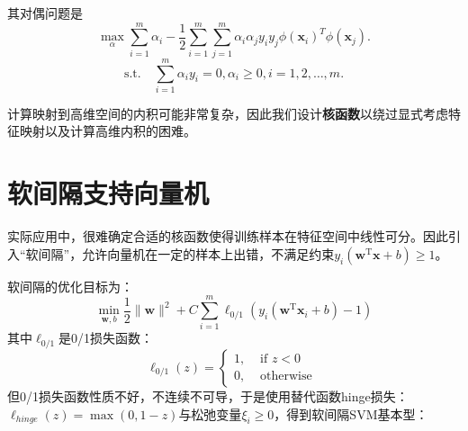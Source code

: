 其对偶问题是
\[
\max_{\alpha} \sum_{i=1}^m \alpha_i - \frac{1}{2} \sum_{i=1}^m \sum_{j=1}^m \alpha_i \alpha_j y_i y_j \phi(\boldsymbol x_i)^T \phi(\boldsymbol x_j).
\]
\[
\text{s.t.} \quad \sum_{i=1}^m\alpha_iy_i = 0, \alpha_i \ge 0, i= 1, 2, \ldots, m.
\]

计算映射到高维空间的内积可能非常复杂，因此我们设计\textbf{核函数}以绕过显式考虑特征映射以及计算高维内积的困难。


\begin{figure}[!htbp]
	\centering
\end{figure}

\section{软间隔支持向量机}\label{sec:4.6}
实际应用中，很难确定合适的核函数使得训练样本在特征空间中线性可分。因此引入“软间隔”，允许向量机在一定的样本上出错，不满足约束$y_i(\boldsymbol{w}^\mathrm{T}\boldsymbol{x}+b) \ge 1$。

软间隔的优化目标为：
\[
\min _{\boldsymbol{w}, b} \frac{1}{2}\|\boldsymbol{w}\|^{2}+C \sum_{i=1}^{m} \ell_{0 / 1}\left(y_{i}\left(\boldsymbol{w}^{\mathrm{T}} \boldsymbol{x}_{i}+b\right)-1\right)
\]
其中$\ell_{0 / 1}$是0/1损失函数：\[
\ell_{0 / 1}(z)=\left\{\begin{array}{ll}1, & \text { if } z<0 \\ 0, & \text { otherwise }\end{array}\right.
\]
但0/1损失函数性质不好，不连续不可导，于是使用替代函数hinge损失：$\ell_{hinge}(z) = \max(0, 1-z)$与松弛变量$\xi_i \ge 0$，得到软间隔SVM基本型：

